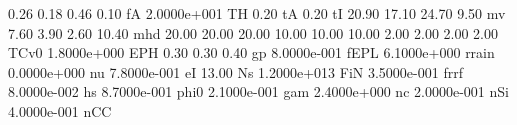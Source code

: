 0.26 0.18 0.46 0.10 fA
2.0000e+001    TH
0.20           tA
0.20           tI
20.90 17.10 24.70 9.50 mv 
7.60 3.90 2.60 10.40         mhd
20.00 20.00 20.00 10.00 10.00 10.00 2.00 2.00 2.00 2.00  TCv0
1.8000e+000   EPH
0.30 0.30 0.40 gp
8.0000e-001  fEPL
6.1000e+000 rrain
0.0000e+000    nu
7.8000e-001    eI
13.00          Ns
1.2000e+013   FiN
3.5000e-001  frrf
8.0000e-002    hs
8.7000e-001  phi0
2.1000e-001   gam
2.4000e+000    nc
2.0000e-001   nSi
4.0000e-001   nCC
